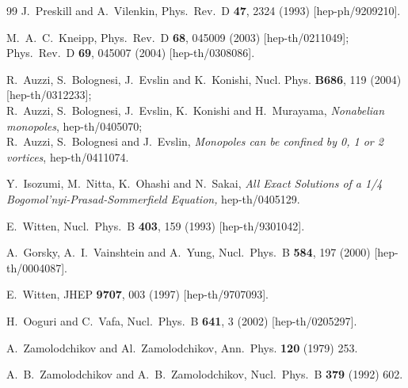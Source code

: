 \begin{thebibliography} {99}
J.~Preskill and A.~Vilenkin,
Phys.\ Rev.\ D {\bf 47}, 2324 (1993)
[hep-ph/9209210].

M.~A.~C.~Kneipp,
Phys.\ Rev.\ D {\bf 68}, 045009 (2003)
[hep-th/0211049];
Phys.\ Rev.\ D {\bf 69}, 045007 (2004)
[hep-th/0308086].

R.~Auzzi, S.~Bolognesi, J.~Evslin and  K.~Konishi,
Nucl. Phys. {\bf B686}, 119 (2004)
[hep-th/0312233];  \\
R.~Auzzi, S.~Bolognesi, J.~Evslin, K.~Konishi and H.~Murayama,
{\em Nonabelian monopoles}, hep-th/0405070;\\
R.~Auzzi, S.~Bolognesi and  J.~Evslin,
{\em Monopoles can be confined by 0, 1 or 2 vortices}, hep-th/0411074.


Y.~Isozumi, M.~Nitta, K.~Ohashi and N.~Sakai,
{\em All Exact Solutions of a 1/4 Bogomol'nyi-Prasad-Sommerfield 
Equation,} hep-th/0405129.



E.~Witten,
Nucl.\ Phys.\ B {\bf 403}, 159 (1993)
[hep-th/9301042].

A.~Gorsky, A.~I.~Vainshtein and A.~Yung,
Nucl.\ Phys.\ B {\bf 584}, 197 (2000)
[hep-th/0004087].

E.~Witten,
JHEP {\bf 9707}, 003 (1997)
[hep-th/9707093].

H.~Ooguri and C.~Vafa,
Nucl.\ Phys.\ B {\bf 641}, 3 (2002)
[hep-th/0205297].

A.~Zamolodchikov and  Al.~Zamolodchikov,
Ann.~Phys. {\bf 120} (1979) 253.

A.~B.~Zamolodchikov and A.~B.~Zamolodchikov,
Nucl.\ Phys.\ B {\bf 379} (1992) 602.


\end{thebibliography}

